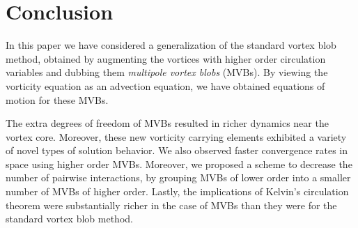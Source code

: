 \documentclass[12pt]{amsart}
\newcommand{\pder}[2]{\ensuremath{\frac{ \partial #1}{\partial #2}}}
\theoremstyle{remark}
\begin{document}

\section{Conclusion}
\label{sec:Conclusion}
In this paper we have considered a generalization of the standard vortex blob method, obtained 
by augmenting the vortices with higher order circulation variables
and dubbing them \emph{multipole vortex blobs} (MVBs).
By viewing the vorticity equation as an advection equation, we have obtained equations of motion for these MVBs.

The extra degrees of freedom of MVBs resulted in richer dynamics near the vortex core.
Moreover, these new vorticity carrying elements exhibited a variety of novel types of solution behavior.
We also observed faster convergence rates in space using higher order MVBs.
Moreover, we proposed a scheme to decrease the number of pairwise interactions, by grouping
MVBs of lower order into a smaller number of MVBs of higher order.
Lastly, the implications of Kelvin's circulation theorem were substantially richer in the case of MVBs than they were for the standard vortex blob method.
\end{document}
